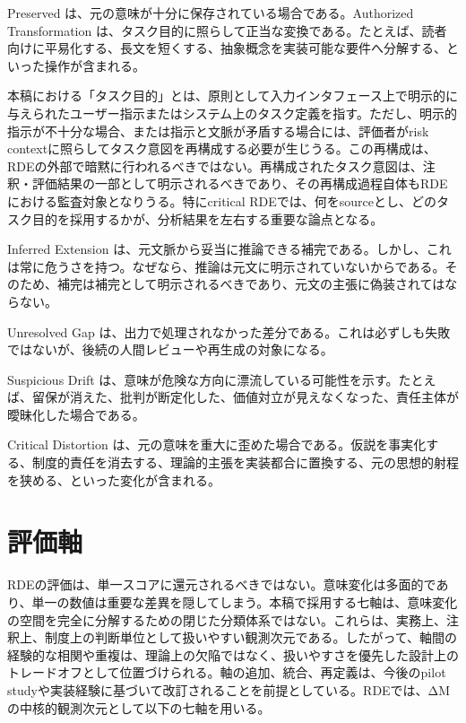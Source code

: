 \documentclass[
  a4paper]{ltjsarticle}
\begin{document}
Preserved は、元の意味が十分に保存されている場合である。Authorized
Transformation
は、タスク目的に照らして正当な変換である。たとえば、読者向けに平易化する、長文を短くする、抽象概念を実装可能な要件へ分解する、といった操作が含まれる。

本稿における「タスク目的」とは、原則として入力インタフェース上で明示的に与えられたユーザー指示またはシステム上のタスク定義を指す。ただし、明示的指示が不十分な場合、または指示と文脈が矛盾する場合には、評価者がrisk
contextに照らしてタスク意図を再構成する必要が生じうる。この再構成は、RDEの外部で暗黙に行われるべきではない。再構成されたタスク意図は、注釈・評価結果の一部として明示されるべきであり、その再構成過程自体もRDEにおける監査対象となりうる。特にcritical
RDEでは、何をsourceとし、どのタスク目的を採用するかが、分析結果を左右する重要な論点となる。

Inferred Extension
は、元文脈から妥当に推論できる補完である。しかし、これは常に危うさを持つ。なぜなら、推論は元文に明示されていないからである。そのため、補完は補完として明示されるべきであり、元文の主張に偽装されてはならない。

Unresolved Gap
は、出力で処理されなかった差分である。これは必ずしも失敗ではないが、後続の人間レビューや再生成の対象になる。

Suspicious Drift
は、意味が危険な方向に漂流している可能性を示す。たとえば、留保が消えた、批判が断定化した、価値対立が見えなくなった、責任主体が曖昧化した場合である。

Critical Distortion
は、元の意味を重大に歪めた場合である。仮説を事実化する、制度的責任を消去する、理論的主張を実装都合に置換する、元の思想的射程を狭める、といった変化が含まれる。

\section{評価軸}\label{evaluation-axes}

RDEの評価は、単一スコアに還元されるべきではない。意味変化は多面的であり、単一の数値は重要な差異を隠してしまう。本稿で採用する七軸は、意味変化の空間を完全に分解するための閉じた分類体系ではない。これらは、実務上、注釈上、制度上の判断単位として扱いやすい観測次元である。したがって、軸間の経験的な相関や重複は、理論上の欠陥ではなく、扱いやすさを優先した設計上のトレードオフとして位置づけられる。軸の追加、統合、再定義は、今後のpilot studyや実装経験に基づいて改訂されることを前提としている。RDEでは、ΔMの中核的観測次元として以下の七軸を用いる。
\end{document}
